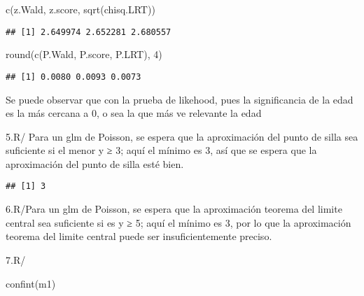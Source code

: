\documentclass[
]{article}
\newenvironment{Shaded}{\begin{snugshade}}{\end{snugshade}}
\newcommand{\DecValTok}[1]{\textcolor[rgb]{0.00,0.00,0.81}{#1}}
\newcommand{\FunctionTok}[1]{\textcolor[rgb]{0.00,0.00,0.00}{#1}}
\newcommand{\NormalTok}[1]{#1}
\newcommand{\SpecialCharTok}[1]{\textcolor[rgb]{0.00,0.00,0.00}{#1}}
\begin{document}
\begin{Shaded}
\begin{Highlighting}[]
 \FunctionTok{c}\NormalTok{(z.Wald, z.score, }\FunctionTok{sqrt}\NormalTok{(chisq.LRT))}
\end{Highlighting}
\end{Shaded}

\begin{verbatim}
## [1] 2.649974 2.652281 2.680557
\end{verbatim}

\begin{Shaded}
\begin{Highlighting}[]
 \FunctionTok{round}\NormalTok{(}\FunctionTok{c}\NormalTok{(P.Wald, P.score, P.LRT), }\DecValTok{4}\NormalTok{)}
\end{Highlighting}
\end{Shaded}

\begin{verbatim}
## [1] 0.0080 0.0093 0.0073
\end{verbatim}

Se puede observar que con la prueba de likehood, pues la significancia
de la edad es la más cercana a 0, o sea la que más ve relevante la edad

5.R/ Para un glm de Poisson, se espera que la aproximación del punto de
silla sea suficiente si el menor y ≥ 3; aquí el mínimo es 3, así que se
espera que la aproximación del punto de silla esté bien.

\begin{Shaded}
\end{Shaded}

\begin{verbatim}
## [1] 3
\end{verbatim}

6.R/Para un glm de Poisson, se espera que la aproximación teorema del
limite central sea suficiente si es y ≥ 5; aquí el mínimo es 3, por lo
que la aproximación teorema del limite central puede ser
insuficientemente preciso.

7.R/

\begin{Shaded}
\begin{Highlighting}[]
\FunctionTok{confint}\NormalTok{(m1)}
\end{Highlighting}
\end{Shaded}
\end{document}
